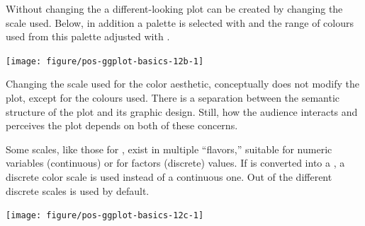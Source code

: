 \documentclass[krantz2]{krantz}\usepackage{knitr}
\begin{document}
Without changing the  a different-looking plot can be created by changing the scale used. Below, in addition a palette is selected with  and the range of colours used from this palette adjusted with .

\begin{knitrout}\footnotesize
{}\color{fgcolor}\begin{kframe}
\begin{alltt}
 \hlopt{+} \hlstd{(} \hlstd{=} \hlstd{,}  \hlstd{=} \hlstd{)}
\end{alltt}
\end{kframe}

{\centering \texttt{[image: figure/pos-ggplot-basics-12b-1]} 

}


\end{knitrout}

Changing the scale used for the color aesthetic, conceptually does not modify the plot, except for the colours used. There is a separation between the semantic structure of the plot and its graphic design. Still, how the audience interacts and perceives the plot depends on both of these concerns.

Some scales, like those for , exist in multiple ``flavors,'' suitable for numeric variables (continuous) or for factors (discrete) values. If  is converted into a , a discrete color scale is used instead of a continuous one. Out of the different discrete scales  is used by default.

\begin{knitrout}\footnotesize
{}\color{fgcolor}\begin{kframe}
\begin{alltt}
\hlstd{(} 
        \hlstd{=} \hlstd{(}     \hlstd{=}  \hlopt{+}
  \hlstd{()}
\end{alltt}
\end{kframe}

{\centering \texttt{[image: figure/pos-ggplot-basics-12c-1]} 

}


\end{knitrout}
\end{document}
